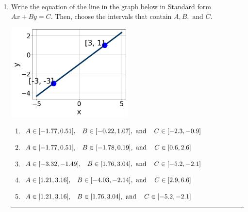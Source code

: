 \documentclass[14pt]{extbook}
\newcommand{\litem}[1]{\item#1\hspace*{-1cm}\rule{\textwidth}{0.4pt}}
\begin{document}
\begin{enumerate}
{\begin{enumerate}[label=\Alph*.]
\end{enumerate} }
\litem{
Write the equation of the line in the graph below in Standard form $Ax+By=C$. Then, choose the intervals that contain $A, B, \text{ and } C$.
\begin{center}
    \includegraphics[width=0.5\textwidth]{../Figures/linearGraphToStandardCopyB.png}
\end{center}
\begin{enumerate}[label=\Alph*.]
\item \( A \in [-1.77, 0.51], \hspace{3mm} B \in [-0.22, 1.07], \text{ and } \hspace{3mm} C \in [-2.3, -0.9] \)
\item \( A \in [-1.77, 0.51], \hspace{3mm} B \in [-1.78, 0.19], \text{ and } \hspace{3mm} C \in [0.6, 2.6] \)
\item \( A \in [-3.32, -1.49], \hspace{3mm} B \in [1.76, 3.04], \text{ and } \hspace{3mm} C \in [-5.2, -2.1] \)
\item \( A \in [1.21, 3.16], \hspace{3mm} B \in [-4.03, -2.14], \text{ and } \hspace{3mm} C \in [2.9, 6.6] \)
\item \( A \in [1.21, 3.16], \hspace{3mm} B \in [1.76, 3.04], \text{ and } \hspace{3mm} C \in [-5.2, -2.1] \)


\end{enumerate}}
\end{enumerate}
\end{document}

